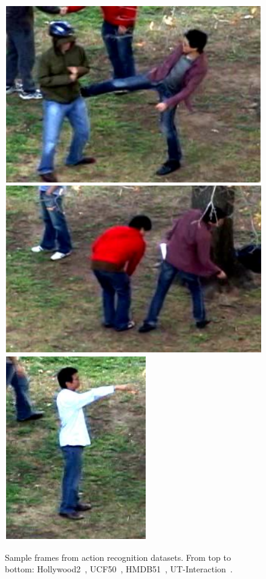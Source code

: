 \documentclass[10pt,twocolumn,letterpaper]{article}
\begin{document}
\begin{figure}[!t]
\begin{center}
\includegraphics[scale=0.32]{figures/dataset_thumb/uti/crop_class4.pdf} 
\includegraphics[scale=0.32]{figures/dataset_thumb/uti/crop_class5.pdf} 
\includegraphics[scale=0.32]{figures/dataset_thumb/uti/crop_class6.pdf} \\
\smallskip
\caption{Sample frames from action recognition datasets. From top to bottom: Hollywood2~\cite{Marszalek09}, UCF50~\cite{Reddy12}, HMDB51~\cite{Kuehne11}, UT-Interaction~\cite{Ryoo10}.\vspace{-.5cm}}
\label{fig:datasets}
\end{center}
\end{figure}
\end{document}
